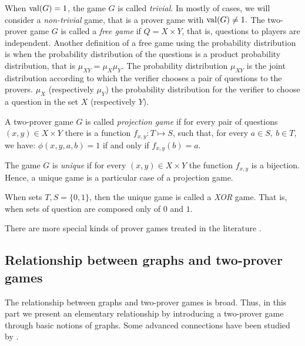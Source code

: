 When $\mathrm{val} (G)=1$, the game $G$ is called \textit{trivial}. In mostly of cases, we will consider a \textit{non-trivial} game, 
that is a prover game with $\mathrm{val} (G) \neq 1.$
The two-prover game $G$ is called a \textit{free game} if $Q=X \times Y$, that is, questions to players are  independent. Another definition of a free game using the probability distribution 
is when  the probability  distribution of the questions is a product probability  distribution, that is $\mu_{XY}=\mu_X \mu_Y.$
The probability distribution $\mu_{XY}$ is  the joint distribution according to which the verifier chooses a pair of questions to the provers. $\mu_X$ (respectively  $\mu_Y$) the probability distribution for the verifier to choose a question in the set $X$ (respectively $Y$).

A two-prover game $G$ is called \textit{projection game} if for every pair of questions $(x,y) \in X \times Y$ there is a function $f_{x,y}: T \longmapsto S$, such that, for every $a\in S, \ b\in T$, we have: $\phi(x,y,a,b)=1$ if and only if $f_{x,y}(b)=a.$ 

The game $G$ is \textit{unique} if for every $(x,y) \in X \times Y$ the function $f_{x,y}$ is a bijection. Hence, a unique game is a particular case of a projection game. 

When sets $T, S = \{0, 1\}$, then the unique game is called a \textit{XOR} game. That is, when sets of question are composed only of $0$ and $1.$

There are more special kinds of prover games treated in the literature \citep*{verbitsky1996towards, cleve2007perfect, raz2010parallel, rao2011parallel, moshkovitz2014parallel, tamaki2015parallel, bavarian2015anchoring, dinur2016multiplayer, hkazla2016forbidden}.

\subsection{Relationship between graphs and two-prover games} \label{expander}

The relationship between graphs and two-prover games is broad. Thus, in this part we present an elementary  relationship by introducing a two-prover game through basic notions of graphs. Some advanced connections have been studied by
\cite*{laekhanukit2014parameters,tamaki2015parallel,dinur2016multiplayer}.

